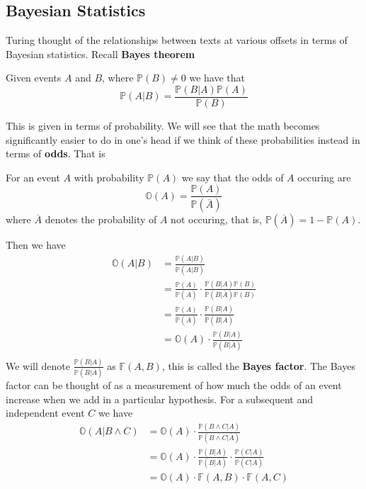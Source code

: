 \subsection{Bayesian Statistics}
Turing thought of the relationships between texts at various
offsets in terms of Bayesian statistics. Recall {\bf{Bayes theorem}}
\begin{theorem}
	Given events $A$ and $B$, where $\mathbb{P}(B) \ne 0$ we have that
	\[
		\mathbb{P}(A|B) = \frac{\mathbb{P}(B|A)\mathbb{P}(A)}{\mathbb{P}(B)}
	\]
\end{theorem}
\noindent This is given in terms of probability. We will see that
the math becomes significantly easier to do in one's head if we
think of these probabilities instead in terms of {\bf{odds}}. That is
\begin{definition}
	For an event $A$ with probability $\mathbb{P}(A)$ we say that the
	odds of $A$ occuring are
	\[
		\mathbb{O}(A) = \frac{\mathbb{P}(A)}{\mathbb{P}(\overline{A})}
	\]
	where $\overline{A}$ denotes the probability of $A$ not occuring,
	that is, $\mathbb{P}(\overline{A}) = 1-\mathbb{P}(A)$.
\end{definition}
\noindent Then we have
\begin{align*}
	\mathbb{O}(A|B) & =
	\frac{\mathbb{P}(A|B)}{\mathbb{P}(\overline{A}|B)}
	\\
	                & =
	\frac{\mathbb{P}(A)}{\mathbb{P}(\overline{A})}\cdot\frac{\mathbb{P}(B|A)\mathbb{P}(B)}{\mathbb{P}(B|\overline{A})\mathbb{P}(B)}
	\\
	                & =
	\frac{\mathbb{P}(A)}{\mathbb{P}(\overline{A})}\cdot\frac{\mathbb{P}(B|A)}{\mathbb{P}(B|\overline{A})}
	\\
	                & =
	\mathbb{O}(A)\cdot\frac{\mathbb{P}(B|A)}{\mathbb{P}(B|\overline{A})}
	\\
\end{align*}
\noindent We will denote
$\frac{\mathbb{P}(B|A)}{\mathbb{P}(B|\overline{A})}$ as
$\mathbb{F}(A,B)$, this is called the {\bf{Bayes factor}}. The
Bayes factor can be thought of as a measurement of how much the
odds of an event increase when we add in a particular hypothesis.
For a subsequent and independent event $C$ we have
\begin{align*}
	\mathbb{O}(A|B\wedge C) & =
	\mathbb{O}(A)\cdot\frac{\mathbb{P}(B\wedge C|
		A)}{\mathbb{P}(B\wedge C| \overline{A})}
	\\
	                        & = \mathbb{O}(A)\cdot\frac{\mathbb{P}(B| A)}{\mathbb{P}(B|
		\overline{A})}\cdot\frac{\mathbb{P}(C|A)}{\mathbb{P}(C|\overline{A})}
	\\
	                        & = \mathbb{O}(A)\cdot \mathbb{F}(A,B) \cdot \mathbb{F}(A,C)
\end{align*}

